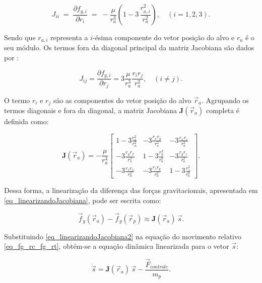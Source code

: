 \begin{equation}
\label{eq_jacobianaDiagonal}
J_{ii} \;=\;
\frac{\partial f_{g,i}}{\partial r_i} \;=\;
-\frac{\mu}{r_a^3}\!\left(1 - 3\,\frac{r_{a,i}^2}{r_a^2}\right), \quad (i=1,2,3).
\end{equation}

Sendo que $r_{a,i}$ representa a $i$-ésima componente do vetor posição do alvo e $r_a$ é o seu módulo.
Os termos fora da diagonal principal da matriz Jacobiana são dados por \cite{fehse2003}:

\begin{equation}
\label{eq_jacobianaForaDiagonal}
J_{ij} =
\frac{\partial f_{g,i}}{\partial r_j} =
3 \frac{\mu}{r_a^3} \frac{r_i r_j}{r_a^2}, \quad (i \neq j).
\end{equation}

O termo $r_i$ e $r_j$ são as componentes do vetor posição do alvo $\vec{r}_a$.
Agrupando os termos diagonais e fora da diagonal, a matriz Jacobiana $\mathbf{J}(\vec{r}_a)$ completa é definida como:

\begin{equation}
\label{eq_jacobianaGenerica}
\mathbf{J}(\vec{r}_a) = -\frac{\mu}{r_a^3}
\begin{bmatrix}
1 - 3\frac{r_x^2}{r_a^2} &  -3\frac{r_x r_y}{r_a^2} &  -3\frac{r_x r_z}{r_a^2} \\
-3\frac{r_y r_x}{r_a^2} & 1 - 3\frac{r_y^2}{r_a^2} & -3\frac{r_y r_z}{r_a^2} \\
-3\frac{r_z r_x}{r_a^2} & -3\frac{r_z r_y}{r_a^2} & 1 - 3\frac{r_z^2}{r_a^2}
\end{bmatrix}.
\end{equation}

Dessa forma, a linearização da diferença das forças gravitacionais, apresentada em \eqref{eq_linearizandoJacobiana}, pode ser escrita como:

\begin{equation}
\label{eq_linearizandoJacobiana2}
\vec f_g(\vec r_{a}) - \vec f_g(\vec r_{p}) \approx \mathbf{J}(\vec{r}_a)\,\vec s.
\end{equation}

Substituindo \eqref{eq_linearizandoJacobiana2} na equação do movimento relativo \eqref{eq_fg_rc_fg_rt}, obtém-se a equação dinâmica linearizada para o vetor $\vec{s}$:

\begin{equation}
\label{eq_fg_rc_fg_rt_linearizada}  
\ddot{\vec{s}} = \mathbf{J}(\vec{r}_a)\,\vec{s} - \frac{\vec F_{controle}}{m_{p}}.
\end{equation}

